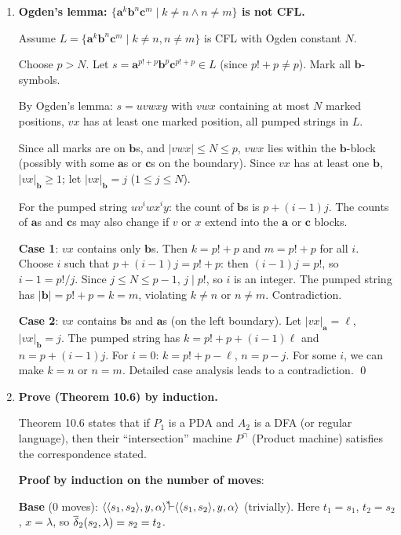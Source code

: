 \begin{enumerate}[{10.}1. ]
\item \textbf{Ogden's lemma: $\{\pmb{a}^k\pmb{b}^n\pmb{c}^m \mid k\neq n \wedge n\neq m\}$ is not CFL.}

Assume $L = \{\pmb{a}^k\pmb{b}^n\pmb{c}^m \mid k\neq n, n\neq m\}$ is CFL with Ogden constant $N$.

Choose $p > N$. Let $s = \pmb{a}^{p!+p}\pmb{b}^p\pmb{c}^{p!+p} \in L$ (since $p!+p \neq p$). Mark all $\pmb{b}$-symbols.

By Ogden's lemma: $s = uvwxy$ with $vwx$ containing at most $N$ marked positions, $vx$ has at least one marked position, all pumped strings in $L$.

Since all marks are on $\pmb{b}$s, and $|vwx|\leq N \leq p$, $vwx$ lies within the $\pmb{b}$-block (possibly with some $\pmb{a}$s or $\pmb{c}$s on the boundary). Since $vx$ has at least one $\pmb{b}$, $|vx|_{\pmb{b}} \geq 1$; let $|vx|_{\pmb{b}} = j$ ($1\leq j\leq N$).

For the pumped string $uv^i wx^i y$: the count of $\pmb{b}$s is $p + (i-1)j$. The counts of $\pmb{a}$s and $\pmb{c}$s may also change if $v$ or $x$ extend into the $\pmb{a}$ or $\pmb{c}$ blocks.

\textbf{Case 1}: $vx$ contains only $\pmb{b}$s. Then $k = p!+p$ and $m = p!+p$ for all $i$. Choose $i$ such that $p + (i-1)j = p!+p$: then $(i-1)j = p!$, so $i-1 = p!/j$. Since $j\leq N\leq p-1$, $j\mid p!$, so $i$ is an integer. The pumped string has $|\pmb{b}|=p!+p=k=m$, violating $k\neq n$ or $n\neq m$. Contradiction.

\textbf{Case 2}: $vx$ contains $\pmb{b}$s and $\pmb{a}$s (on the left boundary). Let $|vx|_{\pmb{a}}=\ell$, $|vx|_{\pmb{b}}=j$. The pumped string has $k = p!+p + (i-1)\ell$ and $n = p + (i-1)j$. For $i=0$: $k = p!+p - \ell$, $n = p-j$. For some $i$, we can make $k = n$ or $n = m$. Detailed case analysis leads to a contradiction. \qed

\item \textbf{Prove (Theorem 10.6) by induction.}

Theorem 10.6 states that if $P_1$ is a PDA and $A_2$ is a DFA (or regular language), then their ``intersection'' machine $P^{\cap}$ (Product machine) satisfies the correspondence stated.

\textbf{Proof by induction on the number of moves}:

\textbf{Base} (0 moves): $\langle\langle s_1,s_2\rangle,y,\alpha\rangle\Dvdash\langle\langle s_1,s_2\rangle,y,\alpha\rangle$ (trivially). Here $t_1=s_1$, $t_2=s_2$, $x=\lambda$, so $\overline{\delta}_2(s_2,\lambda)=s_2=t_2$. \checkmark


\end{enumerate}
